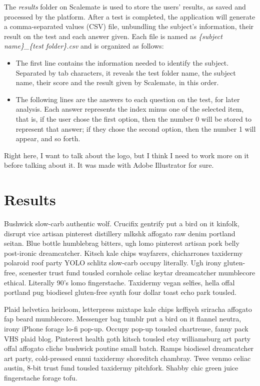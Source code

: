\documentclass[12pt, a4paper, twoside]{article}
\begin{document}
The \textit{results} folder on Scalemate is used to store the users' results, as saved and processed by the platform. After a test is completed, the application will generate a comma-separated values (CSV) file, unbundling the subject's information, their result on the test and each answer given. Each file is named as \textit{\{subject name\}\_\{test folder\}.csv} and is organized as follows:

\begin{itemize}
\item The first line contains the information needed to identify the subject. Separated by tab characters, it reveals the test folder name, the subject name, their score and the result given by Scalemate, in this order.
\item The following lines are the answers to each question on the test, for later analysis. Each answer represents the index minus one of the selected item, that is, if the user chose the first option, then the number 0 will be stored to represent that answer; if they chose the second option, then the number 1 will appear, and so forth.
\end{itemize}

Right here, I want to talk about the logo, but I think I need to work more on it before talking about it. It was made with Adobe Illustrator for sure.

\section{Results}

Bushwick slow-carb authentic wolf. Crucifix gentrify put a bird on it kinfolk, disrupt vice artisan pinterest distillery mlkshk affogato raw denim portland seitan. Blue bottle humblebrag bitters, ugh lomo pinterest artisan pork belly post-ironic dreamcatcher. Kitsch kale chips wayfarers, chicharrones taxidermy polaroid roof party YOLO schlitz slow-carb occupy literally. Ugh irony gluten-free, scenester trust fund tousled cornhole celiac keytar dreamcatcher mumblecore ethical. Literally 90's lomo fingerstache. Taxidermy vegan selfies, hella offal portland pug biodiesel gluten-free synth four dollar toast echo park tousled.

Plaid helvetica heirloom, letterpress mixtape kale chips keffiyeh sriracha affogato fap beard mumblecore. Messenger bag tumblr put a bird on it flannel neutra, irony iPhone forage lo-fi pop-up. Occupy pop-up tousled chartreuse, fanny pack VHS plaid blog. Pinterest health goth kitsch tousled etsy williamsburg art party offal affogato cliche bushwick poutine small batch. Ramps biodiesel dreamcatcher art party, cold-pressed ennui taxidermy shoreditch chambray. Twee venmo celiac austin, 8-bit trust fund tousled taxidermy pitchfork. Shabby chic green juice fingerstache forage tofu.
\end{document}
